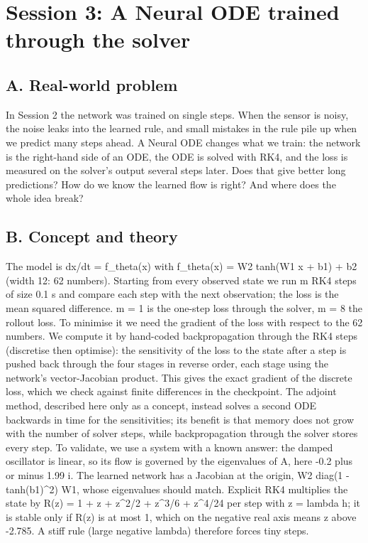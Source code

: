\documentclass[11pt,a4paper]{article}
\begin{document}
\section{Session 3: A Neural ODE trained through the solver}

\subsection*{A. Real-world problem}
In Session 2 the network was trained on single steps. When the sensor is noisy, the noise leaks into the learned rule, and small mistakes in the rule pile up when we predict many steps ahead. A Neural ODE changes what we train: the network is the right-hand side of an ODE, the ODE is solved with RK4, and the loss is measured on the solver's output several steps later. Does that give better long predictions? How do we know the learned flow is right? And where does the whole idea break?

\subsection*{B. Concept and theory}
The model is dx/dt = f\_theta(x) with f\_theta(x) = W2 tanh(W1 x + b1) + b2 (width 12: 62 numbers). Starting from every observed state we run m RK4 steps of size 0.1 s and compare each step with the next observation; the loss is the mean squared difference. m = 1 is the one-step loss through the solver, m = 8 the rollout loss. To minimise it we need the gradient of the loss with respect to the 62 numbers. We compute it by hand-coded backpropagation through the RK4 steps (discretise then optimise): the sensitivity of the loss to the state after a step is pushed back through the four stages in reverse order, each stage using the network's vector-Jacobian product. This gives the exact gradient of the discrete loss, which we check against finite differences in the checkpoint. The adjoint method, described here only as a concept, instead solves a second ODE backwards in time for the sensitivities; its benefit is that memory does not grow with the number of solver steps, while backpropagation through the solver stores every step. To validate, we use a system with a known answer: the damped oscillator is linear, so its flow is governed by the eigenvalues of A, here -0.2 plus or minus 1.99 i. The learned network has a Jacobian at the origin, W2 diag(1 - tanh(b1)\textasciicircum{}2) W1, whose eigenvalues should match. Explicit RK4 multiplies the state by R(z) = 1 + z + z\textasciicircum{}2/2 + z\textasciicircum{}3/6 + z\textasciicircum{}4/24 per step with z = lambda h; it is stable only if \textbar{}R(z)\textbar{} is at most 1, which on the negative real axis means z above -2.785. A stiff rule (large negative lambda) therefore forces tiny steps.
\end{document}
